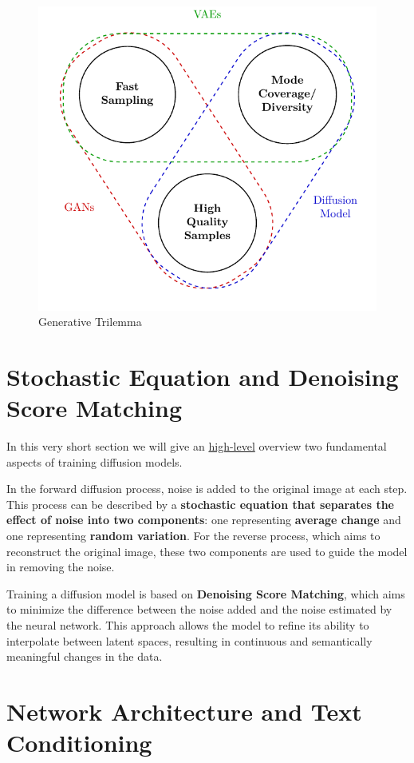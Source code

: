 \begin{figure}[H]
    \centering
    \includegraphics[width=0.7\linewidth]{tikz/chapter10 - Generative Trilemma.pdf}
    \caption{Generative Trilemma}
\end{figure}

\section{Stochastic Equation and Denoising Score Matching}

In this very short section we will give an \underline{high-level} overview two fundamental aspects of training diffusion models.

In the forward diffusion process, noise is added to the original image at each step. This process can be described by a \textbf{stochastic equation that separates the effect of noise into two components}: one representing \textbf{average change} and one representing \textbf{random variation}. For the reverse process, which aims to reconstruct the original image, these two components are used to guide the model in removing the noise.

Training a diffusion model is based on \textbf{Denoising Score Matching}, which aims to minimize the difference between the noise added and the noise estimated by the neural network. This approach allows the model to refine its ability to interpolate between latent spaces, resulting in continuous and semantically meaningful changes in the data.

\section{Network Architecture and Text Conditioning}

